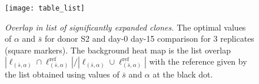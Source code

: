 \documentclass[letterpaper,english,prl,reprint,longbibliography]{revtex4-1} %
\begin{document}
\begin{figure}[tbph!]
\texttt{[image: table\_list]}
\centering{}
\caption{
\emph{Overlap in list of significantly expanded clones.} The optimal values of $\alpha$ and $\bar{s}$ for donor S2 and day-0 day-15 comparison for 3 replicates (square markers). The background heat map is the list overlap $\left|\ell_{(\bar{s},\alpha)}\cap\ell^{\textrm{ref}}_{(\bar{s},\alpha)}\right|/\left|\ell_{(\bar{s},\alpha)}\cup\ell^{\textrm{ref}}_{(\bar{s},\alpha)}\right|$ with the reference given by the list obtained using values of $\bar{s}$ and $\alpha$ at the black dot.
\label{fig:table_list}}
\end{figure}
% 
% 
% 
% 
% 
% 
\end{document}
